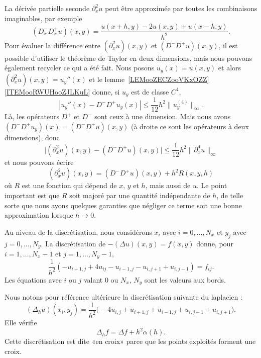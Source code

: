 La dérivée partielle seconde \( \partial^2_xu\) peut être approximée par toutes les combinaisons imaginables, par exemple
\begin{equation}
	(D^-_xD^+_xu)(x,y)=\frac{ u(x+h,y)-2u(x,y)+u(x-h,y) }{ h^2 }.
\end{equation}
Pour évaluer la différence entre \( (\partial^2_xu)(x,y)\) et \( (D^-D^+u)(x,y)\), il est possible d'utiliser le théorème de Taylor en deux dimensions, mais nous pouvons également recycler ce qui a été fait. Nous posons \( u_y(x)=u(x,y)\) et alors \( (\partial_x^2u)(x,y)=u_y''(x)\) et le lemme~\ref{LEMooZECZooVKxOZZ}\ref{ITEMooRWUHooZJLKuL} donne, si \( u_y\) est de classe \( C^4\),
\begin{equation}
	| u_y''(x)-D^-D^+u_y(x) |\leq \frac{1}{ 12 }h^2\| u_y^{(4)} \|_{\infty}.
\end{equation}
Là, les opérateurs \( D^+\) et \( D^-\) sont ceux à une dimension. Mais nous avons \( (D^-D^+u_y)(x)=(D^-D^+u)(x,y)\) (à droite ce sont les opérateurs à deux dimensions), donc
\begin{equation}
	\big| (\partial^2_xu)(x,y)-(D^-D^+u)(x,y) \big|\leq \frac{1}{ 12 }h^2\| \partial^4_xu \|_{\infty}
\end{equation}
et nous pouvons écrire
\begin{equation}        \label{EQooCLSCooYLYJkU}
	(\partial^2_xu)(x,y)=(D^-D^+u)(x,y)+h^2R(x,y,h)
\end{equation}
où \( R\) est une fonction qui dépend de \( x\), \( y\) et \( h\), mais aussi de \( u\). Le point important est que \( R\) soit majoré par une quantité indépendante de \( h\), de telle sorte que nous ayons quelques garanties que négliger ce terme soit une bonne approximation lorsque \( h\to 0\).

Au niveau de la discrétisation, nous considérons \( x_i\) avec \( i=0,\ldots, N_x\) et \( y_j\) avec \( j=0,\ldots, N_y\). La discrétisation de \( -(\Delta u)(x,y)=f(x,y)\) donne, pour \( i=1,\ldots, N_x-1\) et \( j=1,\ldots, N_y-1\),
\begin{equation}        \label{EQooPWXBooPimUrU}
	\frac{1}{ h^2 }(-u_{i+1,j}+4u_{ij}-u_{i-1,j}-u_{i,j+1}+u_{i,j-1})=f_{ij}.
\end{equation}
Les équations avec \( i\) ou \( j\) valant \( 0\) ou \( N_x\), \( N_y\) sont les valeurs aux bords.

\begin{normaltext}
	Nous notons pour référence ultérieure la discrétisation suivante du laplacien :
	\begin{equation}    \label{EQooQQUHooNYVqta}
		(\Delta_hu)(x_i,y_j)=\frac{1}{ h^2 }\big( -4u_{i,j}+u_{i+1,j}+u_{i-1,j}+u_{i,j-1}+u_{i,j+1} \big).
	\end{equation}
	Elle vérifie
	\begin{equation}
		\Delta_hf=\Delta f+h^2\alpha(h).
	\end{equation}
	Cette discrétisation est dite «en croix» parce que les points exploités forment une croix.
\end{normaltext}

